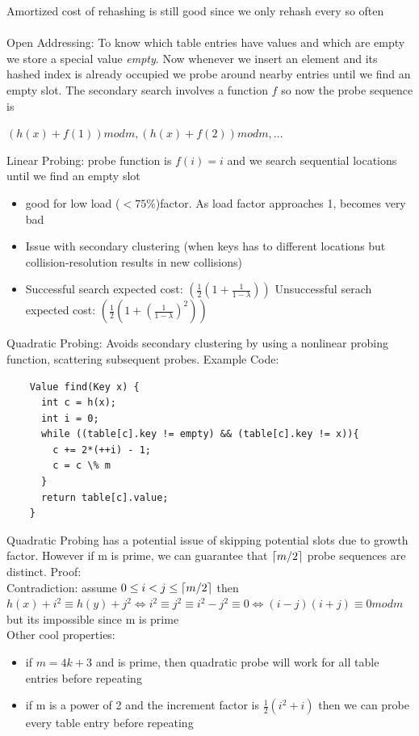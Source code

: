\documentclass{article}
\DeclarePairedDelimiter{\ceil}{\lceil}{\rceil}
\begin{document}
  Amortized cost of rehashing is still good since we only rehash every so often \\ \\
  Open Addressing: To know which table entries have values and which are empty we store a special value \textit{empty}. Now whenever we insert an element and its hashed index is already occupied we probe around nearby entries until we find an empty slot. The secondary search involves a function $f$ so now the probe sequence is
  \begin{center}
    $(h(x) + f(1)) mod m, (h(x) + f(2)) mod m, ...$
  \end{center}
  \newpage
  Linear Probing: probe function is $f(i) = i$ and we search sequential locations until we find an empty slot
  \begin{itemize}[noitemsep]
    \item good for low load ($<75\%$)factor. As load factor approaches 1, becomes very bad
    \item Issue with secondary clustering (when keys has to different locations but collision-resolution results in new collisions)
    \item Successful search expected cost: $(\frac{1}{2}(1 + \frac{1}{1 - \lambda}))$ \quad Unsuccessful serach expected cost: $(\frac{1}{2}(1 + (\frac{1}{1 - \lambda})^{2}))$ \\
  \end{itemize}
  Quadratic Probing: Avoids secondary clustering by using a nonlinear probing function, scattering subsequent probes. Example Code:
  \begin{lstlisting}
    Value find(Key x) {
      int c = h(x);
      int i = 0;
      while ((table[c].key != empty) && (table[c].key != x)){
        c += 2*(++i) - 1;
        c = c \% m
      }
      return table[c].value;
    }
  \end{lstlisting}
  Quadratic Probing has a potential issue of skipping potential slots due to growth factor. However if m is prime, we can guarantee that $\ceil{m/2}$ probe sequences are distinct. Proof:\\
  Contradiction: assume $0 \leq i < j \leq \ceil{m/2}$ then \\
  $h(x) + i^{2} \equiv h(y) + j^{2} \iff i^{2} \equiv j^{2} \equiv i^{2} - j^{2} \equiv 0 \iff (i-j)(i+j) \equiv 0 mod m$ but its impossible since m is prime\\
  Other cool properties:
  \begin{itemize}[noitemsep]
    \item if $m = 4k + 3$ and is prime, then quadratic probe will work for all table entries before repeating
    \item if m is a power of 2 and the increment factor is $\frac{1}{2}(i^{2} + i)$ then we can probe every table entry before repeating \\
  \end{itemize}
\end{document}
